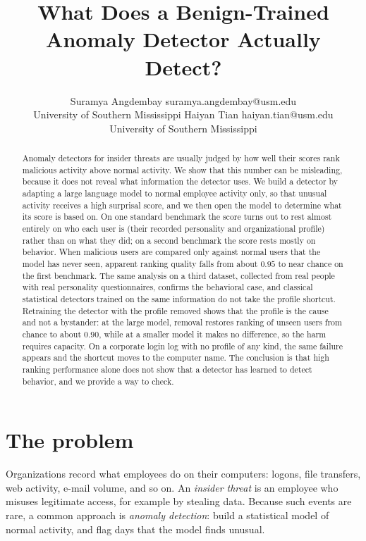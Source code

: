 \documentclass[10pt]{article}
\title{What Does a Benign-Trained Anomaly Detector Actually Detect?}
\author{\name Suramya Angdembay \email suramya.angdembay@usm.edu \\
\addr University of Southern Mississippi
\AND
\name Haiyan Tian \email haiyan.tian@usm.edu \\
\addr University of Southern Mississippi}
\begin{document}
\maketitle

\begin{abstract}
Anomaly detectors for insider threats are usually judged by how well
their scores rank malicious activity above normal activity. We show that
this number can be misleading, because it does not reveal what
information the detector uses. We build a detector by adapting a large
language model to normal employee activity only, so that unusual
activity receives a high surprisal score, and we then open the model to
determine what its score is based on. On one standard benchmark the
score turns out to rest almost entirely on who each user is (their
recorded personality and organizational profile) rather than on what
they did; on a second benchmark the score rests mostly on behavior. When
malicious users are compared only against normal users that the model
has never seen, apparent ranking quality falls from about $0.95$ to near
chance on the first benchmark. The same analysis on a third dataset,
collected from real people with real personality questionnaires,
confirms the behavioral case, and classical statistical detectors
trained on the same information do not take the profile shortcut. Retraining the detector with the profile removed shows that the profile
is the cause and not a bystander: at the large model, removal restores
ranking of unseen users from chance to about $0.90$, while at a smaller
model it makes no difference, so the harm requires capacity. On a
corporate login log with no profile of any kind, the same failure appears
and the shortcut moves to the computer name. The conclusion is that high
ranking performance alone does not show that a detector has learned to
detect behavior, and we provide a way to check.
\end{abstract}

\section{The problem}

Organizations record what employees do on their computers: logons, file
transfers, web activity, e-mail volume, and so on. An \emph{insider
threat} is an employee who misuses legitimate access, for example by
stealing data. Because such events are rare, a common approach is
\emph{anomaly detection}: build a statistical model of normal activity,
and flag days that the model finds unusual.
\end{document}
